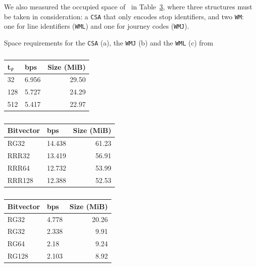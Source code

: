     We also measured the occupied space of \ctr~in Table~\ref{tab:ctr}, where three structures must be taken in consideration: a \texttt{CSA} that only encodes stop identifiers, and two \texttt{WM}: one for line identifiers (\texttt{WML}) and one for journey codes (\texttt{WMJ}).
    
    \begin{table}
        \caption{Space requirements for the \texttt{CSA} (a), the \texttt{WMJ} (b) and the \texttt{WML} (c) from \ctr}
        \label{tab:ctr}
        \begin{subtable}[t]{.28\linewidth}
        \vspace{-12pt}
        \caption{}
        \begin{tabular}[t]{|l|l|r|}
            \hline
            t$_\Psi$ & bps & Size (MiB) \\
             \hline
            32 & 6.956 & 29.50 \\
            128 & 5.727 & 24.29 \\
            512 & 5.417 & 22.97 \\
            \hline
        \end{tabular}
        \end{subtable}
        \begin{subtable}[t]{.38\linewidth}
        \vspace{-12pt}
        \caption{}
        \begin{tabular}[t]{|l|l|r|}
            \hline
            Bitvector & bps & Size (MiB) \\
             \hline
            RG32 & 14.438 & 61.23 \\
            RRR32 & 13.419 & 56.91 \\
            RRR64 & 12.732 & 53.99 \\
            RRR128 & 12.388 & 52.53 \\
            \hline
        \end{tabular}
        \end{subtable}
        \begin{subtable}[t]{.30\linewidth}
        \vspace{-12pt}
        \caption{}
        \begin{tabular}[t]{|l|l|r|}
            \hline
            Bitvector & bps & Size (MiB) \\
             \hline
            RG32 & 4.778 & 20.26 \\
            RG32 & 2.338 & 9.91 \\
            RG64 & 2.18 & 9.24 \\
            RG128 & 2.103 & 8.92 \\
            \hline
        \end{tabular}
        \end{subtable}%
    \end{table}
    
